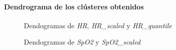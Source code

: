 \paragraph{Dendrograma de los clústeres obtenidos}

\begin{figure}[H]
    \centering
    
    \caption{Dendogramas de \textit{HR}, \textit{HR\_scaled} y \textit{HR\_quantile}}
    \label{fig:raw_data_den_fc}
\end{figure}

\begin{figure}[ht]
    \centering
    \hfill
    \caption{Dendogramas de \textit{SpO2} y \textit{SpO2\_scaled}}\label{fig:raw_data_den_spo2}
\end{figure}

